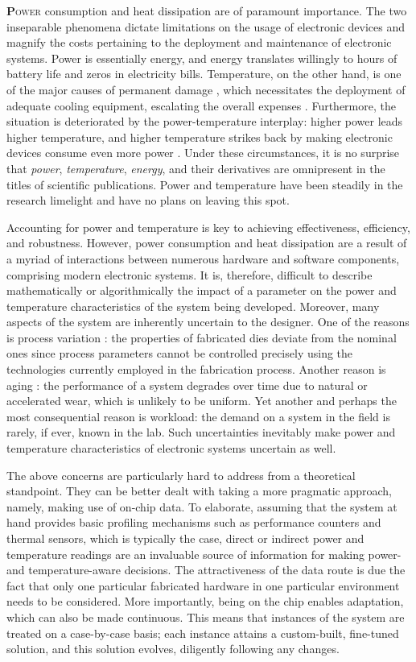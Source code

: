 \lettrine[findent=0.4em, nindent=0em]{\textbf{P}}{ower} consumption and heat
dissipation are of paramount importance. The two inseparable phenomena dictate
limitations on the usage of electronic devices and magnify the costs pertaining
to the deployment and maintenance of electronic systems. Power is essentially
energy, and energy translates willingly to hours of battery life and zeros in
electricity bills. Temperature, on the other hand, is one of the major causes of
permanent damage \cite{jedec}, which necessitates the deployment of adequate
cooling equipment, escalating the overall expenses \cite{chaudhry2015}.
Furthermore, the situation is deteriorated by the power-temperature interplay:
higher power leads higher temperature, and higher temperature strikes back by
making electronic devices consume even more power \cite{liu2007}. Under these
circumstances, it is no surprise that \emph{power}, \emph{temperature},
\emph{energy}, and their derivatives are omnipresent in the titles of scientific
publications. Power and temperature have been steadily in the research limelight
and have no plans on leaving this spot.

Accounting for power and temperature is key to achieving effectiveness,
efficiency, and robustness. However, power consumption and heat dissipation are
a result of a myriad of interactions between numerous hardware and software
components, comprising modern electronic systems. It is, therefore, difficult to
describe mathematically or algorithmically the impact of a parameter on the
power and temperature characteristics of the system being developed. Moreover,
many aspects of the system are inherently uncertain to the designer. One of the
reasons is process variation \cite{chandrakasan2000}: the properties of
fabricated dies deviate from the nominal ones since process parameters cannot be
controlled precisely using the technologies currently employed in the
fabrication process. Another reason is aging \cite{coskun2006}: the performance
of a system degrades over time due to natural or accelerated wear, which is
unlikely to be uniform. Yet another and perhaps the most consequential reason is
workload: the demand on a system in the field is rarely, if ever, known in the
lab. Such uncertainties inevitably make power and temperature characteristics of
electronic systems uncertain as well.

The above concerns are particularly hard to address from a theoretical
standpoint. They can be better dealt with taking a more pragmatic approach,
namely, making use of on-chip data. To elaborate, assuming that the system at
hand provides basic profiling mechanisms such as performance counters and
thermal sensors, which is typically the case, direct or indirect power and
temperature readings are an invaluable source of information for making power-
and temperature-aware decisions. The attractiveness of the data route is due the
fact that only one particular fabricated hardware in one particular environment
needs to be considered. More importantly, being on the chip enables adaptation,
which can also be made continuous. This means that instances of the system are
treated on a case-by-case basis; each instance attains a custom-built,
fine-tuned solution, and this solution evolves, diligently following any
changes.

